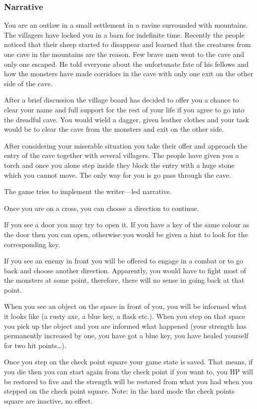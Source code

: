 \documentclass[landscape]{article}
\begin{document}
\subsubsection*{Narrative}

You are an outlaw in a small settlement in a ravine surrounded with mountains.
The villagers have locked you in a barn for indefinite time. Recently the people
noticed that their sheep started to disappear and learned that the creatures
from one cave in the mountains are the reason. Few brave men went to the cave
and only one escaped. He told everyone about the unfortunate fate of his fellows
and how the monsters have made corridors in the cave with only one exit on the
other side of the cave.

After a brief discussion the village board has decided to offer you a chance to
clear your name and full support for the rest of your life if you agree to go
into the dreadful cave. You would wield a dagger, given leather clothes and your
task would be to clear the cave from the monsters and exit on the other side.

After considering your miserable situation you take their offer and approach the
entry of the cave together with several villagers. The people have given you a
torch and once you alone step inside they block the entry with a huge stone
which you cannot move. The only way for you is go pass through the cave.

The game tries to implement the writer---led narrative.

Once you are on a cross, you can choose a direction to continue.

If you see a door you may try to open it. If you have a key of the same colour
as the door then you can open, otherwise you would be given a hint to look for
the corresponding key.

If you see an enemy in front you will be offered to engage in a combat or to go
back and choose another direction. Apparently, you would have to fight most of
the monsters at some point, therefore, there will no sense in going back at that
point.

When you see an object on the space in front of you, you will be informed what
it looks like (a rusty axe, a blue key, a flask etc.). When you step on that
space you pick up the object and you are informed what happened (your strength
has permanently increased by one, you have got a blue key, you have healed
yourself for two hit points\dots).

Once you step on the check point square your game state is saved. That means, if
you die then you can start again from the check point if you want to, you HP
will be restored to five and the strength will be restored from what you had
when you stepped on the check point square. Note: in the hard mode the check
points square are inactive, no effect.
\end{document}
